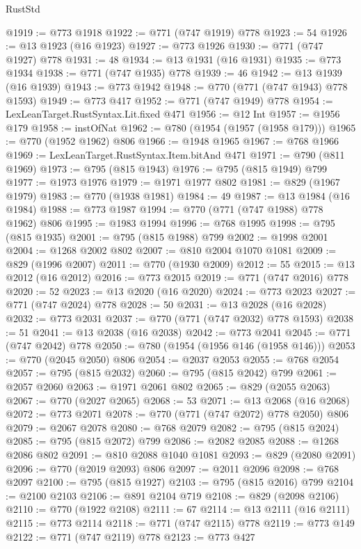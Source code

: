 \begin{lexlean}{RustStd}
\begin{coremodule}
@1919 := @773 @1918
@1922 := @771 (@747 @1919) @778
@1923 := 54
@1926 := @13 @1923 (@16 @1923)
@1927 := @773 @1926
@1930 := @771 (@747 @1927) @778
@1931 := 48
@1934 := @13 @1931 (@16 @1931)
@1935 := @773 @1934
@1938 := @771 (@747 @1935) @778
@1939 := 46
@1942 := @13 @1939 (@16 @1939)
@1943 := @773 @1942
@1948 := @770 (@771 (@747 @1943) @778 @1593)
@1949 := @773 @417
@1952 := @771 (@747 @1949) @778
@1954 := LexLeanTarget.RustSyntax.Lit.fixed @471
@1956 := @12 Int
@1957 := @1956 @179
@1958 := instOfNat
@1962 := @780 (@1954 (@1957 (@1958 @179)))
@1965 := @770 (@1952 @1962) @806
@1966 := @1948 @1965
@1967 := @768 @1966
@1969 := LexLeanTarget.RustSyntax.Item.bitAnd @471
@1971 := @790 (@811 @1969)
@1973 := @795 (@815 @1943)
@1976 := @795 (@815 @1949) @799
@1977 := @1973 @1976
@1979 := @1971 @1977 @802
@1981 := @829 (@1967 @1979)
@1983 := @770 (@1938 @1981)
@1984 := 49
@1987 := @13 @1984 (@16 @1984)
@1988 := @773 @1987
@1994 := @770 (@771 (@747 @1988) @778 @1962) @806
@1995 := @1983 @1994
@1996 := @768 @1995
@1998 := @795 (@815 @1935)
@2001 := @795 (@815 @1988) @799
@2002 := @1998 @2001
@2004 := @1268 @2002 @802
@2007 := @810 @2004 @1070 @1081
@2009 := @829 (@1996 @2007)
@2011 := @770 (@1930 @2009)
@2012 := 55
@2015 := @13 @2012 (@16 @2012)
@2016 := @773 @2015
@2019 := @771 (@747 @2016) @778
@2020 := 52
@2023 := @13 @2020 (@16 @2020)
@2024 := @773 @2023
@2027 := @771 (@747 @2024) @778
@2028 := 50
@2031 := @13 @2028 (@16 @2028)
@2032 := @773 @2031
@2037 := @770 (@771 (@747 @2032) @778 @1593)
@2038 := 51
@2041 := @13 @2038 (@16 @2038)
@2042 := @773 @2041
@2045 := @771 (@747 @2042) @778
@2050 := @780 (@1954 (@1956 @146 (@1958 @146)))
@2053 := @770 (@2045 @2050) @806
@2054 := @2037 @2053
@2055 := @768 @2054
@2057 := @795 (@815 @2032)
@2060 := @795 (@815 @2042) @799
@2061 := @2057 @2060
@2063 := @1971 @2061 @802
@2065 := @829 (@2055 @2063)
@2067 := @770 (@2027 @2065)
@2068 := 53
@2071 := @13 @2068 (@16 @2068)
@2072 := @773 @2071
@2078 := @770 (@771 (@747 @2072) @778 @2050) @806
@2079 := @2067 @2078
@2080 := @768 @2079
@2082 := @795 (@815 @2024)
@2085 := @795 (@815 @2072) @799
@2086 := @2082 @2085
@2088 := @1268 @2086 @802
@2091 := @810 @2088 @1040 @1081
@2093 := @829 (@2080 @2091)
@2096 := @770 (@2019 @2093) @806
@2097 := @2011 @2096
@2098 := @768 @2097
@2100 := @795 (@815 @1927)
@2103 := @795 (@815 @2016) @799
@2104 := @2100 @2103
@2106 := @891 @2104 @719
@2108 := @829 (@2098 @2106)
@2110 := @770 (@1922 @2108)
@2111 := 67
@2114 := @13 @2111 (@16 @2111)
@2115 := @773 @2114
@2118 := @771 (@747 @2115) @778
@2119 := @773 @149
@2122 := @771 (@747 @2119) @778
@2123 := @773 @427

\end{coremodule}
\end{lexlean}
